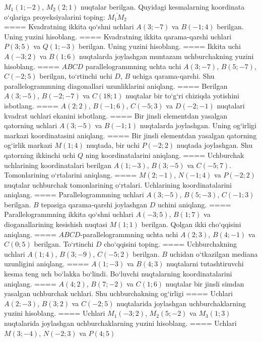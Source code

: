 $M_1 (1; -2) $, $M_2 (2; 1) $ nuqtalar berilgan.
Quyidagi kesmalarning koordinata o‘qlariga proyeksiyalarini toping: $\overline{M_1M_2}$ \\
====
Kvadratning ikkita qo‘shni uchlari $A (3; -7)$ va
$B (-1;4) $ berilgan. Uning yuzini hisoblang.
====
Kvadratning ikkita qarama-qarshi uchlari $P (3; 5) $ va
$Q (1; -3) $ berilgan. Uning yuzini hisoblang.
====
Ikkita uchi $A (-3; 2) $ va $B (1; 6) $ nuqtalarda
joylashgan muntazam uchburchakning yuzini hisoblang.
====
$ABCD$ parallelogrammning uchta uchi $A (3; -7) $,
$B (5; -7) $, $C (-2; 5) $ berilgan, to‘rtinchi uchi $D$,
$B$ uchiga qarama-qarshi. Shu parallelogrammning diagonallari
uzunliklarini aniqlang.
====
Berilgan $A (3; -5) $, $B (-2; -7)$ va
$C (18; 1) $ nuqtalar bir to‘g‘ri chiziqda yotishini isbotlang.
====
$A (2;2) $, $B (-1;6) $, $C (-5;3) $ va $D (-2;-1) $
nuqtalari kvadrat uchlari ekanini isbotlang.
====
Bir jinsli elementdan yasalgan qatorning uchlari
$A (3;-5) $ va $B (-1;1) $ nuqtalarda joylashgan. Uning og‘irligi
markazi koordinatasini aniqlang.
====
Bir jinsli elementdan yasalgan qatorning og‘irlik markazi
$M (1;4) $ nuqtada, bir uchi $P (-2;2) $ nuqtada joylashgan. Shu
qatorning ikkinchi uchi $Q$ ning koordinatalarini aniqlang.
====
Uchburchak uchlarining koordinatalari berilgan
$A (1;-3) $, $B (3;-5) $ va $C (-5;7) $. Tomonlarining o‘rtalarini
aniqlang.
====
$M (2;-1) $, $N (-1;4) $ va $P (-2;2) $ nuqtalar
uchburchak tomonlarining o‘rtalari. Uchlarining koordinatalarini
aniqlang.
====
Parallelogrammning uchlari
$A (3;-5) $, $B (5;-3) $, $C (-1;3) $ berilgan. $B$ tepasiga
qarama-qarshi joylashgan $D$ uchini aniqlang.
====
Parallelogrammning ikkita qo‘shni uchlari $A (-3;5) $, $B (1;7) $
va dioganallarining kesishish nuqtasi $M (1;1)$ berilgan. Qolgan ikki
cho‘qqisini aniqlang.
====
$ABCD$-parallelogrammning uchta uchi
$A (2;3) $, $B (4;-1) $ va $C (0;5) $ berilgan. To‘rtinchi $D$
cho‘qqisini toping.
====
Uchburchakning uchlari $A (1;4) $, $B (3;-9) $, $C (-5;2) $
berilgan. $B$ uchidan o‘tkazilgan mediana uzunligini aniqlang.
====
$A (1;-3) $ va $B (4;3) $ nuqtalarni tutashtiruvchi
kesma teng uch bo‘lakka bo‘lindi. Bo‘luvchi nuqtalarning koordinatalarini
aniqlang.
====
$A (4;2) $, $B (7;-2) $ va $C (1;6) $ nuqtalar bir jinsli
simdan yasalgan uchburchak uchlari. Shu uchburchakning og‘irligi
====
Uchlari $A (2;-3) $, $B (3;2) $ va $C (-2;5) $
nuqtalarida joylashgan uchburchaklarning yuzini hisoblang.
====
Uchlari $M_1 (-3;2) $, $M_2 (5;-2) $ va $M_3 (1;3) $
nuqtalarida joylashgan uchburchaklarning yuzini hisoblang.
====
Uchlari $M (3;-4) $, $N (-2;3) $ va $P (4;5) $
